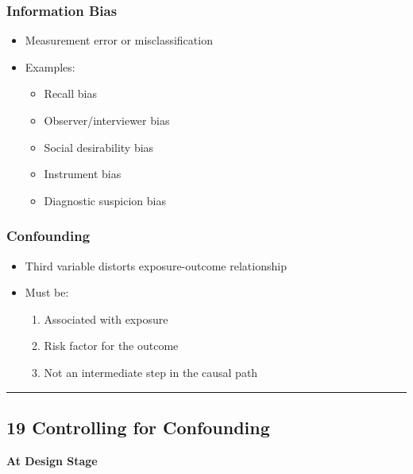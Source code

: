 \documentclass[
  letterpaper,
  DIV=11,
  numbers=noendperiod]{scrartcl}
\providecommand{\tightlist}{%
  \setlength{\itemsep}{0pt}\setlength{\parskip}{0pt}}
\begin{document}
\subsubsection{Information Bias}

\begin{itemize}
\tightlist
\item
  Measurement error or misclassification
\item
  Examples:

  \begin{itemize}
  \tightlist
  \item
    Recall bias
  \item
    Observer/interviewer bias
  \item
    Social desirability bias
  \item
    Instrument bias
  \item
    Diagnostic suspicion bias
  \end{itemize}
\end{itemize}

\subsubsection{Confounding}

\begin{itemize}
\tightlist
\item
  Third variable distorts exposure-outcome relationship
\item
  Must be:

  \begin{enumerate}
  \def\labelenumi{\arabic{enumi}.}
  \tightlist
  \item
    Associated with exposure
  \item
    Risk factor for the outcome
  \item
    Not an intermediate step in the causal path
  \end{enumerate}
\end{itemize}

\begin{center}\rule{0.5\linewidth}{0.5pt}\end{center}

\subsection{\texorpdfstring{{19} {Controlling for
Confounding}}{19 Controlling for Confounding}}\label{controlling-for-confounding}

\textbf{At Design Stage}
\end{document}
